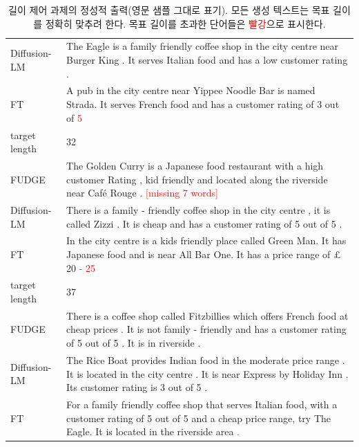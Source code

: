 \documentclass{article}
\newcommand\errorspan[1]{\textcolor{red}{#1}}
\begin{document}
\begin{table}
{\begin{tabular}{lp{13cm}}
Diffusion-LM &   The Eagle is a family friendly coffee shop in the city centre near Burger King . It serves Italian food and has a low customer rating . \\
FT &  A pub in the city centre near Yippee Noodle Bar is named Strada. It serves French food and has a customer rating of 3 out of \errorspan{ 5 }
\\
\toprule
target length &  32 \\
\midrule
FUDGE &  The Golden Curry is a Japanese food restaurant with a high customer Rating , kid friendly and located along the riverside near Café Rouge . \errorspan{[missing 7 words]}\\
Diffusion-LM &   There is a family - friendly coffee shop in the city centre , it is called Zizzi . It is cheap and has a customer rating of 5 out of 5 . \\
FT &  In the city centre is a kids friendly place called Green Man. It has Japanese food and is near All Bar One. It has a price range of £ 20 \errorspan{ - 25 }
\\
\toprule
target length &  37 \\
\midrule
FUDGE &  There is a coffee shop called Fitzbillies which offers French food at cheap prices . It is not family - friendly and has a customer rating of 5 out of 5 . It is in riverside . \\
Diffusion-LM &   The Rice Boat provides Indian food in the moderate price range . It is located in the city centre . It is near Express by Holiday Inn . Its customer rating is 3 out of 5 . \\
FT &  For a family friendly coffee shop that serves Italian food, with a customer rating of 5 out of 5 and a cheap price range, try The Eagle. It is located in the riverside area \errorspan{. }
\\
\bottomrule
\end{tabular}}
\caption{\label{app:qualitative-length} 길이 제어 과제의 정성적 출력(영문 샘플 그대로 표기). 모든 생성 텍스트는 목표 길이를 정확히 맞추려 한다. 목표 길이를 초과한 단어들은 \errorspan{빨강}으로 표시한다.}
\end{table}
\end{document}
